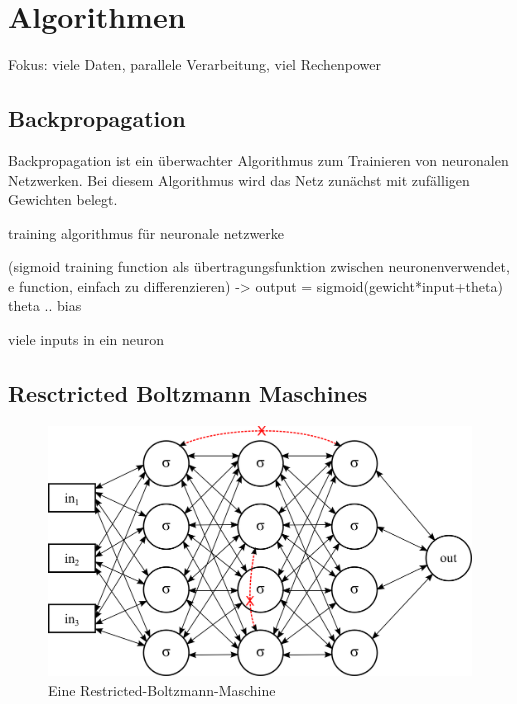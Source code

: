 \chapter{Algorithmen}
\label{cha:algorithmen}



Fokus: viele Daten, parallele Verarbeitung, viel Rechenpower

\section{Backpropagation}

Backpropagation ist ein überwachter Algorithmus zum Trainieren von neuronalen Netzwerken. Bei diesem Algorithmus wird das Netz zunächst mit zufälligen Gewichten belegt. 


training algorithmus für neuronale netzwerke

(sigmoid training function als übertragungsfunktion zwischen neuronenverwendet, e function, einfach zu differenzieren)
-> output = sigmoid(gewicht*input+theta)
theta .. bias

viele inputs in ein neuron


\section{Resctricted Boltzmann Maschines}

\begin{figure}
	\centering
	\includegraphics[scale=1]{images/rbm.png}
	\caption{Eine Restricted-Boltzmann-Maschine}
	\label{fig:rbm}
\end{figure}

